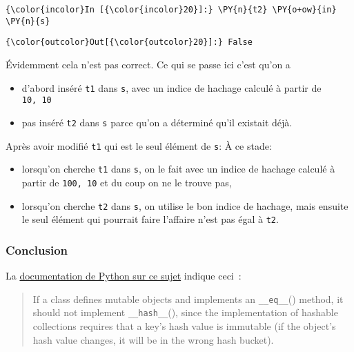     \begin{Verbatim}[commandchars=\\\{\},frame=single,framerule=0.3mm,rulecolor=\color{cellframecolor}]
{\color{incolor}In [{\color{incolor}20}]:} \PY{n}{t2} \PY{o+ow}{in} \PY{n}{s}
\end{Verbatim}


\begin{Verbatim}[commandchars=\\\{\},frame=single,framerule=0.3mm,rulecolor=\color{cellframecolor}]
{\color{outcolor}Out[{\color{outcolor}20}]:} False
\end{Verbatim}
            
    Évidemment cela n'est pas correct. Ce qui se passe ici c'est qu'on a

\begin{itemize}
\tightlist
\item
  d'abord inséré \texttt{t1} dans \texttt{s}, avec un indice de hachage
  calculé à partir de \texttt{10,\ 10}
\item
  pas inséré \texttt{t2} dans \texttt{s} parce qu'on a déterminé qu'il
  existait déjà.
\end{itemize}

Après avoir modifié \texttt{t1} qui est le seul élément de \texttt{s}: À
ce stade:

\begin{itemize}
\tightlist
\item
  lorsqu'on cherche \texttt{t1} dans \texttt{s}, on le fait avec un
  indice de hachage calculé à partir de \texttt{100,\ 10} et du coup on
  ne le trouve pas,
\item
  lorsqu'on cherche \texttt{t2} dans \texttt{s}, on utilise le bon
  indice de hachage, mais ensuite le seul élément qui pourrait faire
  l'affaire n'est pas égal à \texttt{t2}.
\end{itemize}

    \hypertarget{conclusion}{%
\subsubsection{Conclusion}\label{conclusion}}

    La
\href{https://docs.python.org/3/reference/datamodel.html\#object.__hash__}{documentation
de Python sur ce sujet} indique ceci~:

\begin{quote}
If a class defines mutable objects and implements an
\texttt{\_\_eq\_\_}() method, it should not implement
\texttt{\_\_hash\_\_}(), since the implementation of hashable
collections requires that a key's hash value is immutable (if the
object's hash value changes, it will be in the wrong hash bucket).
\end{quote}

